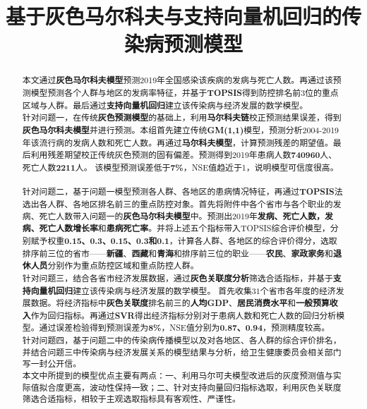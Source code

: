 \documentclass{whutmod}
\title{基于灰色马尔科夫与支持向量机回归的传染病预测模型}
\begin{document}
\maketitle

	
	\begin{abstract}

本文通过\textbf{灰色马尔科夫模型}预测2019年全国感染该疾病的发病与死亡人数。再通过该预测模型预测各个人群与地区的发病率特征，并基于\textbf{TOPSIS}得到防控排名前$3$位的重点区域与人群。最后通过\textbf{支持向量机回归}建立该传染病与经济发展的数学模型。
~\\

针对问题一，在传统\textbf{灰色预测模型}的基础上，利用\textbf{马尔科夫链}校正预测结果误差，得到\textbf{灰色马尔科夫模型}并进行预测。本组首先建立传统\textbf{GM(1,1)}模型，预测分析2004-2019年该流行病的发病人数和死亡人数。再通过\textbf{马尔科夫模型}，计算预测残差的期望值。最后利用残差期望校正传统灰色预测的固有偏差。预测得到2019年患病人数\textbf{740960}人、死亡人数\textbf{2211}人。	该模型预测误差低于\textbf{7\%}，NSE值趋近于1，说明模型可信度很高。
~\\

针对问题二，基于问题一模型预测各人群、各地区的患病情况特征，再通过\textbf{TOPSIS}法选出各人群、各地区排名前三的重点防控对象。首先将附件中各个省市与各个职业的发病、死亡人数带入问题一的\textbf{灰色马尔科夫模型}中。预测出2019年\textbf{发病、死亡人数，发病、死亡人数增长率}和\textbf{患病死亡率}。并将上述五个指标带入TOPSIS综合评价模型，分别赋予权重\textbf{0.15、0.3、0.15、0.3和0.1}，计算各人群、各地区的综合评价得分，选取排序前三位的省市——\textbf{新疆}、\textbf{西藏}和\textbf{青海}和排序前三位的职业——\textbf{农民}、\textbf{家政家务}和\textbf{退休人员}分别作为重点防控区域和重点防控人群。
~\\


针对问题三，结合各省市经济发展数据，通过\textbf{灰色关联度分析}筛选合适指标，并基于\textbf{支持向量机回归}建立该传染病与经济发展的数学模型。  首先收集$31$个省市各年度的经济发展数据。将经济指标中\textbf{灰色关联度}排名前三的\textbf{人均GDP}、\textbf{居民消费水平}和\textbf{一般预算收入}作为回归指标。再通过\textbf{SVR}得出经济指标分别对于患病人数和死亡人数的回归分析模型。通过误差检验得到预测误差为\textbf{8\%}，NSE值分别为\textbf{0.87、0.94}，预测精度较高。
~\\

针对问题四，基于问题二中的传染病传播模型以及对各地区、各人群的综合评价排名，并结合问题三中传染病与经济发展关系的模型结果与分析，给卫生健康委员会相关部门写一封公开信。
~\\

本文中所提到的模型优点主要有两点：一、利用马尔可夫模型改进后的灰度预测值与实际值拟合度更高，波动性保持一致；二、针对支持向量回归指标选取，利用灰色关联度筛选合适指标，相较于主观选取指标具有客观性、严谨性。


	
  


	\end{abstract}
	\tableofcontents
	\newpage	%
	
\end{document}
